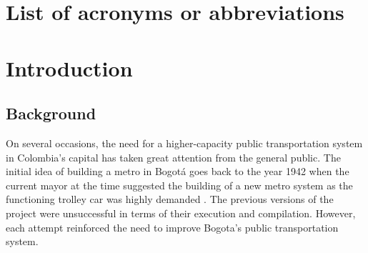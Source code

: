 \documentclass[12pt, a4paper]{report}
\begin{document}
\tableofcontents
{}
\thispagestyle{plain}
\listoffigures
\listoftables


\chapter*{List of acronyms or abbreviations}
\begin{sortedlist} %
  \end{sortedlist}
%
%
%
%
%
%
%

\chapter{Introduction} \label{Chap1}

\section{Background}


On several occasions, the need for a higher-capacity public transportation system in Colombia's capital has taken great attention from the general public. The initial idea of building a metro in Bogot\'{a} goes back to the year 1942 when the current mayor at the time suggested the building of a new metro system as the functioning trolley car was highly demanded \citep{metrodebogotaHistoriaMetroBogota2011}. The previous versions of the project were unsuccessful in terms of their execution and compilation. However, each attempt reinforced the need to improve Bogota's public transportation system.
\end{document}
